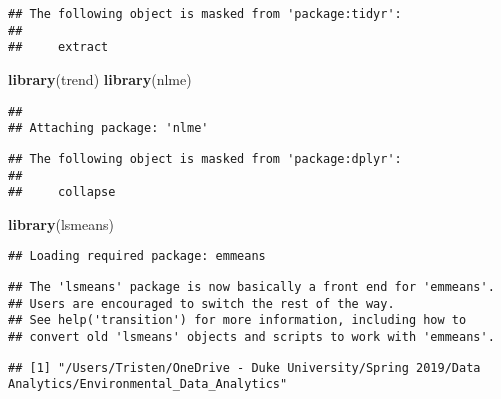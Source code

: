 \documentclass[]{article}
\newenvironment{Shaded}{\begin{snugshade}}{\end{snugshade}}
\newcommand{\KeywordTok}[1]{\textcolor[rgb]{0.13,0.29,0.53}{\textbf{#1}}}
\newcommand{\CommentTok}[1]{\textcolor[rgb]{0.56,0.35,0.01}{\textit{#1}}}
\newcommand{\NormalTok}[1]{#1}
\begin{document}
\begin{verbatim}
## The following object is masked from 'package:tidyr':
## 
##     extract
\end{verbatim}

\begin{Shaded}
\begin{Highlighting}[]
\KeywordTok{library}\NormalTok{(trend)}
\KeywordTok{library}\NormalTok{(nlme)}
\end{Highlighting}
\end{Shaded}

\begin{verbatim}
## 
## Attaching package: 'nlme'
\end{verbatim}

\begin{verbatim}
## The following object is masked from 'package:dplyr':
## 
##     collapse
\end{verbatim}

\begin{Shaded}
\begin{Highlighting}[]
\KeywordTok{library}\NormalTok{(lsmeans)}
\end{Highlighting}
\end{Shaded}

\begin{verbatim}
## Loading required package: emmeans
\end{verbatim}

\begin{verbatim}
## The 'lsmeans' package is now basically a front end for 'emmeans'.
## Users are encouraged to switch the rest of the way.
## See help('transition') for more information, including how to
## convert old 'lsmeans' objects and scripts to work with 'emmeans'.
\end{verbatim}

\begin{Shaded}
\end{Shaded}

\begin{verbatim}
## [1] "/Users/Tristen/OneDrive - Duke University/Spring 2019/Data Analytics/Environmental_Data_Analytics"
\end{verbatim}
\end{document}
